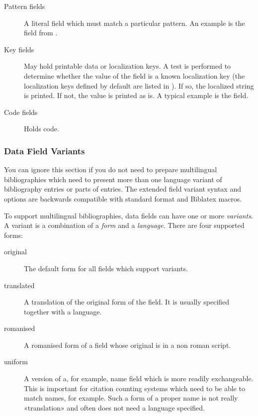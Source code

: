 \documentclass{ltxdockit}[2011/03/25]
\newcommand*{\biblatex}{Biblatex\xspace}
\begin{document}
\begin{description}
\begin{description}
\item[Pattern fields] A literal field which must match a particular pattern. An example is the  field from .

\item[Key fields] May hold printable data or localization keys. A test is performed to determine whether the value of the field is a known localization key (the localization keys defined by default are listed in ). If so, the localized string is printed. If not, the value is printed as is. A typical example is the  field.

\item[Code fields] Holds \tex code.

\end{description}
\end{description}

\subsubsection[Data Field Variants]{Data Field Variants\BiberOnlyMark}
\label{bib:fld:var}

You can ignore this section if you do not need to prepare multilingual bibliographies which need to present more than one language variant of bibliography entries or parts of entries. The extended field variant syntax and options are backwards compatible with standard \bibtex format and \biblatex macros.

To support multilingual bibliographies, data fields can have one or more \emph{variants}. A variant is a combination of a \emph{form} and a \emph{language}. There are four supported forms:

\begin{description}
\item[original] The default form for all fields which support variants.
\item[translated] A translation of the original form of the field. It is usually specified together with a language.
\item[romanised] A romanised form of a field whose original is in a non roman script.
\item[uniform] A version of a, for example, name field which is more readily exchangeable. This is important for citation counting systems which need to be able to match names, for example. Such a form of a proper name is not really «translation» and often does not need a language specified.
\end{description}
\end{document}
